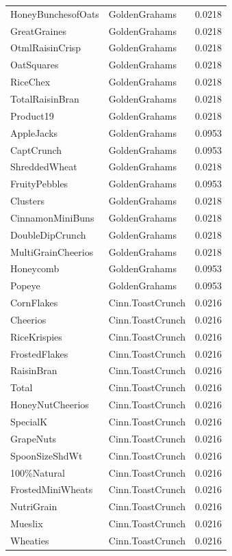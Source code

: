 \begin{table}[!htbp]
\begin{tabular}{lll}
HoneyBunchesofOats & GoldenGrahams & 0.0218
\\
GreatGraines & GoldenGrahams & 0.0218
\\
OtmlRaisinCrisp & GoldenGrahams & 0.0218
\\
OatSquares & GoldenGrahams & 0.0218
\\
RiceChex & GoldenGrahams & 0.0218
\\
TotalRaisinBran & GoldenGrahams & 0.0218
\\
Product19 & GoldenGrahams & 0.0218
\\
AppleJacks & GoldenGrahams & 0.0953
\\
CaptCrunch & GoldenGrahams & 0.0953
\\
ShreddedWheat & GoldenGrahams & 0.0218
\\
FruityPebbles & GoldenGrahams & 0.0953
\\
Clusters & GoldenGrahams & 0.0218
\\
CinnamonMiniBuns & GoldenGrahams & 0.0218
\\
DoubleDipCrunch & GoldenGrahams & 0.0218
\\
MultiGrainCheerios & GoldenGrahams & 0.0218
\\
Honeycomb & GoldenGrahams & 0.0953
\\
Popeye & GoldenGrahams & 0.0953
\\
CornFlakes & Cinn.ToastCrunch & 0.0216
\\
Cheerios & Cinn.ToastCrunch & 0.0216
\\
RiceKrispies & Cinn.ToastCrunch & 0.0216
\\
FrostedFlakes & Cinn.ToastCrunch & 0.0216
\\
RaisinBran & Cinn.ToastCrunch & 0.0216
\\
Total & Cinn.ToastCrunch & 0.0216
\\
HoneyNutCheerios & Cinn.ToastCrunch & 0.0216
\\
SpecialK & Cinn.ToastCrunch & 0.0216
\\
GrapeNuts & Cinn.ToastCrunch & 0.0216
\\
SpoonSizeShdWt & Cinn.ToastCrunch & 0.0216
\\
100\%Natural & Cinn.ToastCrunch & 0.0216
\\
FrostedMiniWheats & Cinn.ToastCrunch & 0.0216
\\
NutriGrain & Cinn.ToastCrunch & 0.0216
\\
Mueslix & Cinn.ToastCrunch & 0.0216
\\
Wheaties & Cinn.ToastCrunch & 0.0216
\\

\end{tabular}
\end{table}
